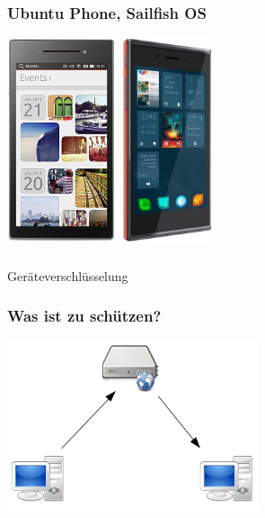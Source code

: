 \documentclass[12pt, xcolor={svgnames,table}]{beamer}
\begin{document}
\begin{frame}
  \frametitle{Ubuntu Phone, Sailfish OS}
    \begin{center}
      \includegraphics[height=6cm]{img/ubuntuphone.jpg}
      \hspace{0.5cm}
      \includegraphics[height=6cm]{img/sailfishos.jpg}
    \end{center}
\end{frame}

\begin{frame}
    \frametitle{}
    \Large Geräteverschlüsselung
\end{frame}

\begin{frame}
    \frametitle{Was ist zu schützen?}
    \begin{center}
      \includegraphics[height=5cm]{img/c-s.png}
    \end{center}
\end{frame}
\end{document}
